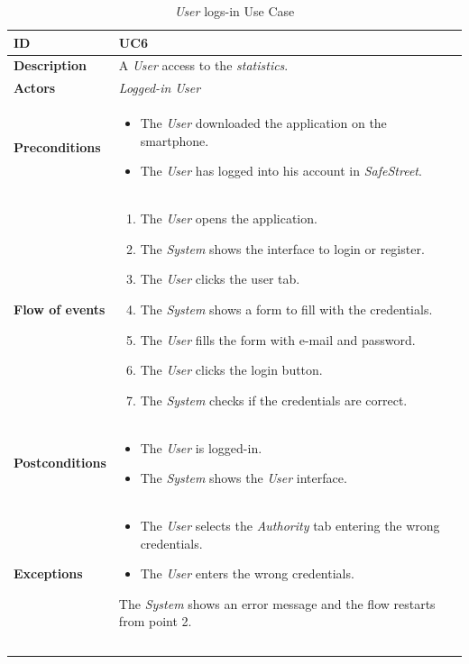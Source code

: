 \documentclass {article}
\begin{document}
	\begin{longtable}{| p{3 cm} | p{10.5 cm} |} 
			\hline
			{\bf ID} & UC6 \\
			\hline
			{\bf Description} & A {\it User} access to the {\it statistics}.\\
			\hline
			{\bf Actors} & {\it Logged-in User}\\
			\hline
			{\bf Preconditions} & 	
			\begin{itemize}
				\item The {\it User} downloaded the application on the smartphone.
				\item The {\it User} has logged into his account in {\it SafeStreet}.
			\end{itemize}
			\\
			\hline
			{\bf Flow of events} &	
			\begin{enumerate}
				\item The {\it User} opens the application.
				\item The {\it System} shows the interface to login or register.
				\item The {\it User} clicks the user tab.
				\item The {\it System} shows a form to fill with the credentials.
				\item The {\it User} fills the form with e-mail and password. 
				\item The {\it User} clicks the login button.
				\item The {\it System} checks if the credentials are correct. 
			\end{enumerate}
			\\
			\hline
			{\bf Postconditions} & 
			\begin{itemize}
				\item The {\it User} is logged-in.
				\item The {\it System} shows the {\it User} interface.
			\end{itemize}
			\\
			\hline
			{\bf Exceptions} & 	
			\begin{itemize}
				\item The {\it User} selects the {\it Authority} tab entering the wrong credentials. 
				\item The {\it User} enters the wrong credentials.
			\end{itemize}
			The {\it System} shows an error message and the flow restarts from point 2.
			\\ \\
			\hline
			\caption{{\it User} logs-in Use Case}
			\end{longtable}
			
\end{document}
